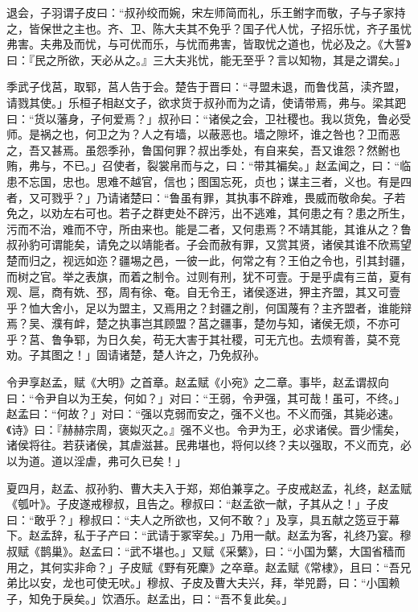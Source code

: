 \documentclass[]{article}
\begin{document}
退会，子羽谓子皮曰：``叔孙绞而婉，宋左师简而礼，乐王鲋字而敬，子与子家持之，皆保世之主也。齐、卫、陈大夫其不免乎？国子代人忧，子招乐忧，齐子虽忧弗害。夫弗及而忧，与可优而乐，与忧而弗害，皆取忧之道也，忧必及之。《大誓》曰：『民之所欲，天必从之。』三大夫兆忧，能无至乎？言以知物，其是之谓矣。」

季武子伐莒，取郓，莒人告于会。楚告于晋曰：``寻盟未退，而鲁伐莒，渎齐盟，请戮其使。」乐桓子相赵文子，欲求货于叔孙而为之请，使请带焉，弗与。梁其跁曰：``货以藩身，子何爱焉？」叔孙曰：``诸侯之会，卫社稷也。我以货免，鲁必受师。是祸之也，何卫之为？人之有墙，以蔽恶也。墙之隙坏，谁之咎也？卫而恶之，吾又甚焉。虽怨季孙，鲁国何罪？叔出季处，有自来矣，吾又谁怨？然鲋也贿，弗与，不已。」召使者，裂裳帛而与之，曰：``带其褊矣。」赵孟闻之，曰：``临患不忘国，忠也。思难不越官，信也；图国忘死，贞也；谋主三者，义也。有是四者，又可戮乎？」乃请诸楚曰：``鲁虽有罪，其执事不辟难，畏威而敬命矣。子若免之，以劝左右可也。若子之群吏处不辟污，出不逃难，其何患之有？患之所生，污而不治，难而不守，所由来也。能是二者，又何患焉？不靖其能，其谁从之？鲁叔孙豹可谓能矣，请免之以靖能者。子会而赦有罪，又赏其贤，诸侯其谁不欣焉望楚而归之，视远如迩？疆埸之邑，一彼一此，何常之有？王伯之令也，引其封疆，而树之官。举之表旗，而着之制令。过则有刑，犹不可壹。于是乎虞有三苗，夏有观、扈，商有姺、邳，周有徐、奄。自无令王，诸侯逐进，狎主齐盟，其又可壹乎？恤大舍小，足以为盟主，又焉用之？封疆之削，何国蔑有？主齐盟者，谁能辩焉？吴、濮有衅，楚之执事岂其顾盟？莒之疆事，楚勿与知，诸侯无烦，不亦可乎？莒、鲁争郓，为日久矣，苟无大害于其社稷，可无亢也。去烦宥善，莫不竞劝。子其图之！」固请诸楚，楚人许之，乃免叔孙。

令尹享赵孟，赋《大明》之首章。赵孟赋《小宛》之二章。事毕，赵孟谓叔向曰：``令尹自以为王矣，何如？」对曰：``王弱，令尹强，其可哉！虽可，不终。」赵孟曰：``何故？」对曰：``强以克弱而安之，强不义也。不义而强，其毙必速。《诗》曰：『赫赫宗周，褒姒灭之。』强不义也。令尹为王，必求诸侯。晋少懦矣，诸侯将往。若获诸侯，其虐滋甚。民弗堪也，将何以终？夫以强取，不义而克，必以为道。道以淫虐，弗可久已矣！」

夏四月，赵孟、叔孙豹、曹大夫入于郑，郑伯兼享之。子皮戒赵孟，礼终，赵孟赋《瓠叶》。子皮遂戒穆叔，且告之。穆叔曰：``赵孟欲一献，子其从之！」子皮曰：``敢乎？」穆叔曰：``夫人之所欲也，又何不敢？」及享，具五献之笾豆于幕下。赵孟辞，私于子产曰：``武请于冢宰矣。」乃用一献。赵孟为客，礼终乃宴。穆叔赋《鹊巢》。赵孟曰：``武不堪也。」又赋《采蘩》，曰：``小国为蘩，大国省穑而用之，其何实非命？」子皮赋《野有死麇》之卒章。赵孟赋《常棣》，且曰：``吾兄弟比以安，龙也可使无吠。」穆叔、子皮及曹大夫兴，拜，举兕爵，曰：``小国赖子，知免于戾矣。」饮酒乐。赵孟出，曰：``吾不复此矣。」
\end{document}
